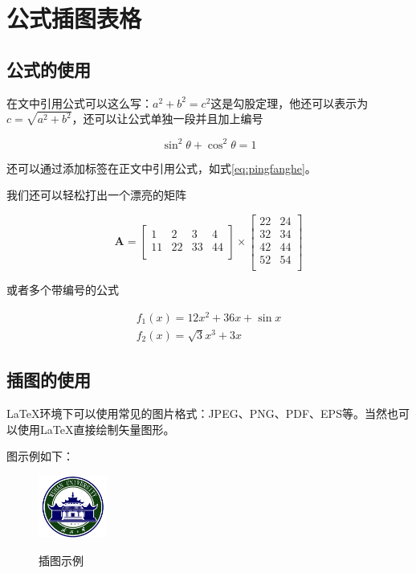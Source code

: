 
\chapter{公式插图表格}

\section{公式的使用}
在文中引用公式可以这么写：$a^2+b^2=c^2$这是勾股定理，他还可以表示为$c=\sqrt{a^2+b^2}$，还可以让公式单独一段并且加上编号

\begin{equation}
\sin^2{\theta}+\cos^2{\theta}=1 \label{eq:pingfanghe}
\end{equation}

还可以通过添加标签在正文中引用公式，如式\eqref{eq:pingfanghe}。

我们还可以轻松打出一个漂亮的矩阵

\begin{equation}
  \mathbf{A}=
  \left[\begin{matrix}
    1&2&3&4\\
    11&22&33&44\\
  \end{matrix}\right] \times
  \left[\begin{matrix}
    22&24\\
    32&34\\
    42&44\\
    52&54\\
  \end{matrix}\right]
\end{equation}

或者多个带编号的公式

\begin{eqnarray}
  f_1(x)=12x^2+36x+\sin x\\
  f_2(x)=\sqrt{3}{x^3+3x}
\end{eqnarray}

\section{插图的使用}

\LaTeX 环境下可以使用常见的图片格式：JPEG、PNG、PDF、EPS等。当然也可以使用\LaTeX 直接绘制矢量图形。

图示例如下：

\begin{figure}[!htb]
  \centering
  \includegraphics[width=0.2\textwidth]
  {figures/whulogo.png}\\
  \caption{插图示例}
  \label{fig:whu}
\end{figure}

